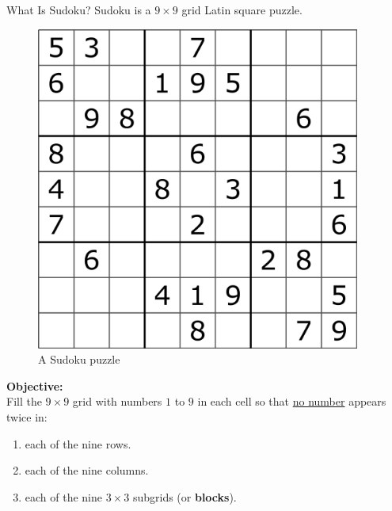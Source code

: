 \documentclass[final]{beamer}
\newlength{\sepwidth}
\newlength{\colwidth}
\newcommand{\separatorcolumn}{\begin{column}{\sepwidth}\end{column}}
\begin{document}
\begin{frame}[t]
\begin{columns}[t]
\separatorcolumn

\begin{column}{\colwidth}

  \begin{alertblock}{\Large What Is Sudoku?}
      \large Sudoku is a $9 \times 9$ grid Latin square puzzle.
      \vspace{\baselineskip}
      \begin{figure}
        \centering
        \includegraphics[scale=0.25]{pic/sudokutable.png}
        \caption{A Sudoku puzzle}
        \label{fig:my_label}
    \end{figure}
    \textbf{Objective:}\\
    \large Fill the $9\times9$ grid with numbers $1$ to $9$ in each cell so that \underline{no number} appears twice in:
    \begin{enumerate}
        \item each of the nine rows.
        \item each of the nine columns.
        \item each of the nine $3 \times 3$ subgrids (or \textbf{blocks}).
    \end{enumerate}
  \end{alertblock}
  



\end{column}
\end{columns}
\end{frame}
\end{document}
